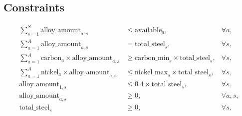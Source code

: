 \documentclass{article}
\begin{document}
\subsection*{Constraints}
\begin{align*}
\sum_{s=1}^{S} \text{alloy\_amount}_{a,s} & \leq \text{available}_a, & \forall a, \\
\sum_{a=1}^{A} \text{alloy\_amount}_{a,s} & = \text{total\_steel}_s, & \forall s, \\
\sum_{a=1}^{A} \text{carbon}_a \times \text{alloy\_amount}_{a,s} & \geq \text{carbon\_min}_s \times \text{total\_steel}_s, & \forall s, \\
\sum_{a=1}^{A} \text{nickel}_a \times \text{alloy\_amount}_{a,s} & \leq \text{nickel\_max}_s \times \text{total\_steel}_s, & \forall s, \\
\text{alloy\_amount}_{1,s} & \leq 0.4 \times \text{total\_steel}_s, & \forall s, \\
\text{alloy\_amount}_{a,s} & \geq 0, & \forall a, s, \\
\text{total\_steel}_s & \geq 0, & \forall s.
\end{align*}
\end{document}

